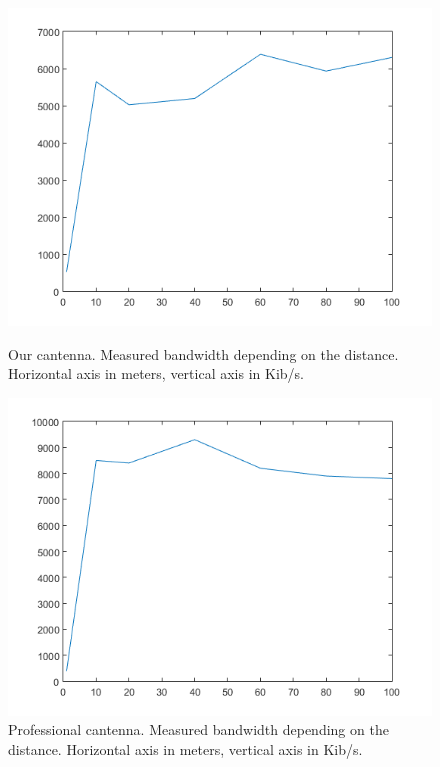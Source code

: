 	\begin{figure}\begin{center}
			\includegraphics[width=\figurewidth]{plots/can_b.png}
			\caption{Our cantenna. Measured bandwidth depending on the distance. Horizontal axis in meters, vertical axis in Kib/s.}
			\label{img:dist:band:can}
			
			\includegraphics[width=\figurewidth]{plots/prof_b.png}
			\caption{Professional cantenna. Measured bandwidth depending on the distance. Horizontal axis in meters, vertical axis in Kib/s.}
			\label{img:dist:band:prof}
			

\end{center}
\end{figure}
